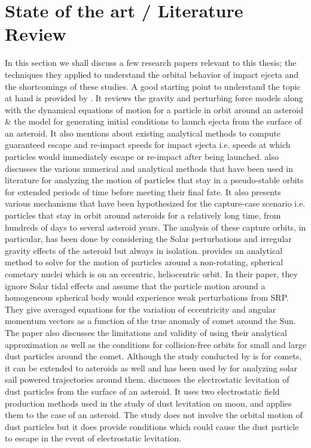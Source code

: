 \section{State of the art / Literature Review}
\label{sec:literature_review}
In this section we shall discuss a few research papers relevant to this thesis; the techniques they applied to understand the orbital behavior of impact ejecta and the shortcomings of these studies.
%
\newline\newline
%
A good starting point to understand the topic at hand is provided by \cite{scheeres2002fate}. It reviews the gravity and perturbing force models along with the dynamical equations of motion for a particle in orbit around an asteroid \& the model for generating initial conditions to launch ejecta from the surface of an asteroid. It also mentions about existing analytical methods to compute guaranteed escape and re-impact speeds for impact ejecta i.e. speeds at which particles would immediately escape or re-impact after being launched. \cite{scheeres2002fate} also discusses the various numerical and analytical methods that have been used in literature for analyzing the motion of particles that stay in a pseudo-stable orbits for extended periods of time before meeting their final fate. It also presents various mechanisms that have been hypothesized for the capture-case scenario i.e. particles that stay in orbit around asteroids for a relatively long time, from hundreds of days to several asteroid years. The analysis of these capture orbits, in particular, has been done by considering the Solar perturbations and irregular gravity effects of the asteroid but always in isolation.
%
\newline\newline
%
\cite{richter1995stability} provides an analytical method to solve for the motion of particles around a non-rotating, spherical cometary nuclei which is on an eccentric, heliocentric orbit. In their paper, they ignore Solar tidal effects and assume that the particle motion around a homogeneous spherical body would experience weak perturbations from \gls{SRP}. They give averaged equations for the variation of eccentricity and angular momentum vectors as a function of the true anomaly of comet around the Sun. The paper also discusses the limitations and validity of using their analytical approximation as well as the conditions for collision-free orbits for small and large dust particles around the comet. Although the study conducted by \cite{richter1995stability} is for comets, it can be extended to asteroids as well and has been used by \cite{morrow2001solar} for analyzing solar sail powered trajectories around them. \cite{lee1996dust} discusses the electrostatic levitation of dust particles from the surface of an asteroid. It uses two electrostatic field production methods used in the study of dust levitation on moon, and applies them to the case of an asteroid. The study does not involve the orbital motion of dust particles but it does provide conditions which could cause the dust particle to escape in the event of electrostatic levitation.

